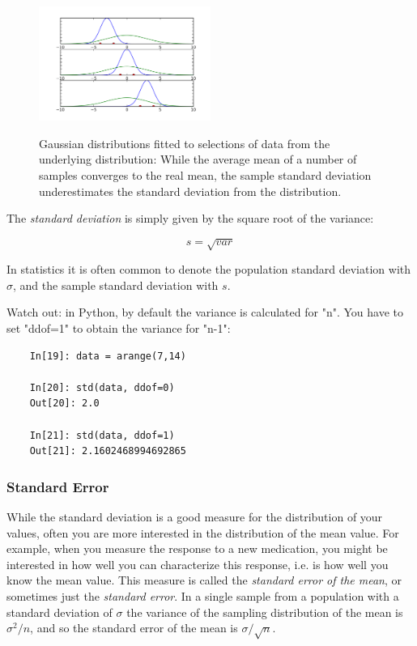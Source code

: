 \begin{figure}[ht]
  \centering
  \includegraphics[width=0.5\textwidth]{../Images/mean_std.png}\\
  \caption{Gaussian distributions fitted to selections of data from the underlying distribution: While the average mean of a number of samples converges to the real mean, the sample standard deviation underestimates the standard deviation from the distribution.}\label{fig:mean_std}
\end{figure}

The \emph{standard deviation}  is simply given by the square root of the variance:

\begin{equation}
  s = \sqrt{var}
\end{equation}

In statistics it is often common to denote the population standard deviation with $\sigma$, and the sample standard deviation with $s$.

Watch out: in Python, by default the variance is calculated for "n". You have to set "ddof=1" to obtain the variance for "n-1":

\begin{lstlisting}
    In[19]: data = arange(7,14)

    In[20]: std(data, ddof=0)
    Out[20]: 2.0

    In[21]: std(data, ddof=1)
    Out[21]: 2.1602468994692865
\end{lstlisting}

\subsubsection{Standard Error} 
While the standard deviation is a good measure for the distribution of your values, often you are more interested in the distribution of the mean value. For example, when you measure the response to a new medication, you might be interested in how well you can characterize this response, i.e. is how well you know the mean value. This measure is called the \emph{standard error of the mean}, or sometimes just the \emph{standard error}. In a single sample from a population with a standard deviation of $\sigma$ the variance of the sampling distribution of the mean is $\sigma^2/n$, and so the standard error of the mean is $\sigma/\sqrt{n}$.


